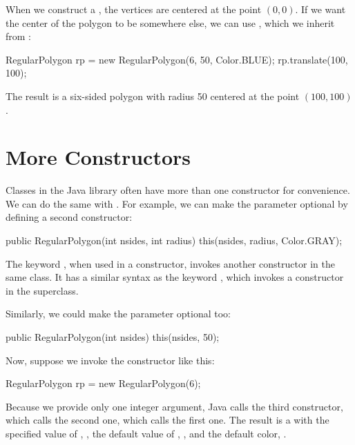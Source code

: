 When we construct a , the vertices are centered at the point $(0, 0)$.
If we want the center of the polygon to be somewhere else, we can use , which we inherit from :

\begin{code}
RegularPolygon rp = new RegularPolygon(6, 50, Color.BLUE);
rp.translate(100, 100);
\end{code}

The result is a six-sided polygon with radius 50 centered at the point $(100, 100)$.



\section{More Constructors}

Classes in the Java library often have more than one constructor for convenience.
We can do the same with .
For example, we can make the  parameter optional by defining a second constructor:

\begin{code}
public RegularPolygon(int nsides, int radius) {
    this(nsides, radius, Color.GRAY);
}
\end{code}

The keyword , when used in a constructor, invokes another constructor in the same class.
It has a similar syntax as the keyword , which invokes a constructor in the superclass.

Similarly, we could make the  parameter optional too:

\begin{code}
public RegularPolygon(int nsides) {
    this(nsides, 50);
}
\end{code}

Now, suppose we invoke the  constructor like this:

\begin{code}
RegularPolygon rp = new RegularPolygon(6);
\end{code}

Because we provide only one integer argument, Java calls the third constructor, which calls the second one, which calls the first one.
The result is a  with the specified value of , , the default value of , , and the default color, .

